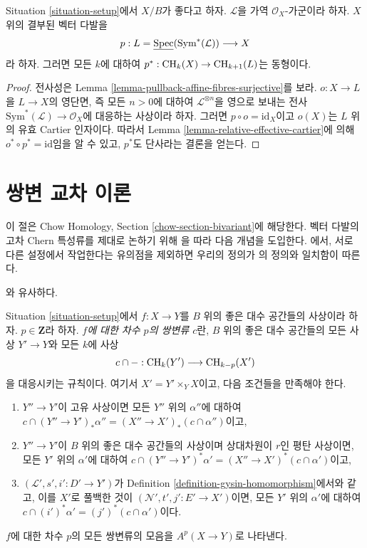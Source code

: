 \begin{lemma}
\label{lemma-linebundle}
Situation \ref{situation-setup}에서 $X/B$가 좋다고 하자.
$\mathcal{L}$을 가역 $\mathcal{O}_X$-가군이라 하자. $X$ 위의 결부된
벡터 다발을
$$
p :
L = \underline{\mathop{\mathrm{Spec}}}(\text{Sym}^*(\mathcal{L}))
\longrightarrow
X
$$
라 하자. 그러면 모든 $k$에 대하여
$p^* : \mathop{\mathrm{CH}}\nolimits_k(X) \to \mathop{\mathrm{CH}}\nolimits_{k + 1}(L)$는 동형이다.
\end{lemma}

\begin{proof}
전사성은 Lemma \ref{lemma-pullback-affine-fibres-surjective}를 보라.
$o : X \to L$을 $L \to X$의 영단면, 즉 모든 $n > 0$에 대하여
$\mathcal{L}^{\otimes n}$을 영으로 보내는 전사
$\text{Sym}^*(\mathcal{L}) \to \mathcal{O}_X$에 대응하는 사상이라 하자.
그러면 $p \circ o = \text{id}_X$이고 $o(X)$는 $L$ 위의
유효 Cartier 인자이다. 따라서 Lemma
\ref{lemma-relative-effective-cartier}에 의해
$o^* \circ p^* = \text{id}$임을 알 수 있고, $p^*$도 단사라는
결론을 얻는다.
\end{proof}

\section{쌍변 교차 이론}
\label{section-bivariant}

\noindent
이 절은 Chow Homology, Section \ref{chow-section-bivariant}에 해당한다.
벡터 다발의 고차 Chern 특성류를 제대로 논하기 위해
\cite{FM}을 따라 다음 개념을 도입한다.
\cite[Theorem 17.1]{F}에서, 서로 다른 설정에서 작업한다는 유의점을
제외하면 우리의 정의가 \cite{F}의 정의와 일치함이 따른다.

\begin{definition}
\label{definition-bivariant-class}
\begin{reference}
\cite[Definition 17.1]{F}와 유사하다.
\end{reference}
Situation \ref{situation-setup}에서
$f : X \to Y$를 $B$ 위의 좋은 대수 공간들의 사상이라 하자.
$p \in \mathbf{Z}$라 하자.
{\it $f$에 대한 차수 $p$의 쌍변류 $c$}란,
$B$ 위의 좋은 대수 공간들의 모든 사상 $Y' \to Y$와 모든 $k$에
사상
$$
c \cap - : \mathop{\mathrm{CH}}\nolimits_k(Y') \longrightarrow \mathop{\mathrm{CH}}\nolimits_{k - p}(X')
$$
을 대응시키는 규칙이다. 여기서 $X' = Y' \times_Y X$이고,
다음 조건들을 만족해야 한다.
\begin{enumerate}
\item $Y'' \to Y'$이 고유 사상이면 모든 $Y''$ 위의
$\alpha''$에 대하여
$c \cap (Y'' \to Y')_*\alpha'' = (X'' \to X')_*(c \cap \alpha'')$이고,
\item $Y'' \to Y'$이 $B$ 위의 좋은 대수 공간들의 사상이며
상대차원이 $r$인 평탄 사상이면, 모든 $Y'$ 위의 $\alpha'$에 대하여
$c \cap (Y'' \to Y')^*\alpha' = (X'' \to X')^*(c \cap \alpha')$이고,
\item $(\mathcal{L}', s', i' : D' \to Y')$가 Definition
\ref{definition-gysin-homomorphism}에서와 같고, 이를 $X'$로 풀백한
것이 $(\mathcal{N}', t', j' : E' \to X')$이면, 모든
$Y'$ 위의 $\alpha'$에 대하여
$c \cap (i')^*\alpha' = (j')^*(c \cap \alpha')$이다.
\end{enumerate}
$f$에 대한 차수 $p$의 모든 쌍변류의 모음을
$A^p(X \to Y)$로 나타낸다.
\end{definition}

